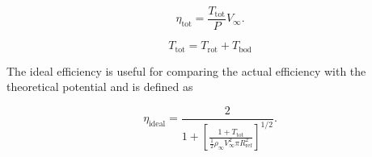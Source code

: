 \begin{equation}
    \eta_\text{tot} = \frac{T_\text{tot}}{P} V_\infty.
\end{equation}

\where

\begin{equation}
    T_\text{tot} = T_\text{rot}+T_\text{bod}
\end{equation}


\noindent The ideal efficiency is useful for comparing the actual efficiency with the theoretical potential and is defined as

\begin{equation}
    \eta_\text{ideal} = \frac{2}{1 + \left[\frac{1 + T_\text{tot}}{\frac{1}{2}\rho_\infty V_\infty^2 \pi R_\text{ref}^2}\right]^{1/2}}.
\end{equation}

